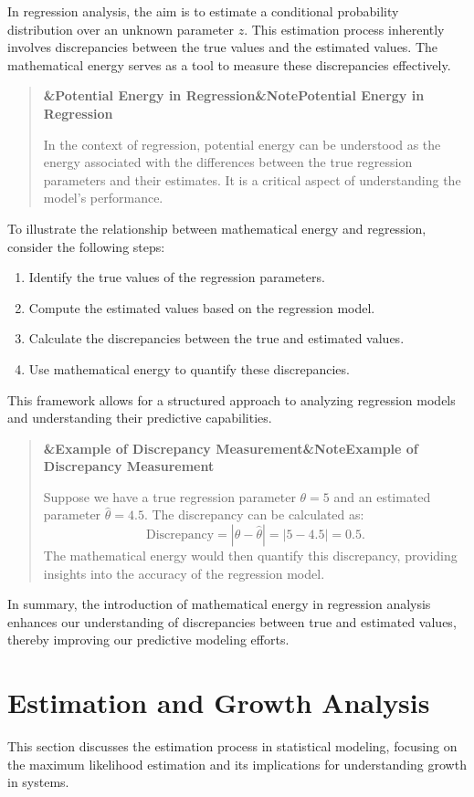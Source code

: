 \documentclass[a4paper]{article}
\newcommand{\boxheading}[1]{%
  \par\smallskip
  \noindent\textbf{\ifx&#1&Note\else#1\fi}\par
  \smallskip
}
\newenvironment{thmbox}[1][]{%
  \begin{quote}\color{blue!60!black}\boxheading{#1}\normalcolor
}{\end{quote}}
\newenvironment{exbox}[1][]{%
  \begin{quote}\color{brown!70!black}\boxheading{#1}\normalcolor
}{\end{quote}}
\begin{document}
In regression analysis, the aim is to estimate a conditional probability distribution over an unknown parameter \( z \). This estimation process inherently involves discrepancies between the true values and the estimated values. The mathematical energy serves as a tool to measure these discrepancies effectively.

\begin{thmbox}[Potential Energy in Regression]
In the context of regression, potential energy can be understood as the energy associated with the differences between the true regression parameters and their estimates. It is a critical aspect of understanding the model's performance.
\end{thmbox}

To illustrate the relationship between mathematical energy and regression, consider the following steps:

\begin{enumerate}
    \item Identify the true values of the regression parameters.
    \item Compute the estimated values based on the regression model.
    \item Calculate the discrepancies between the true and estimated values.
    \item Use mathematical energy to quantify these discrepancies.
\end{enumerate}

This framework allows for a structured approach to analyzing regression models and understanding their predictive capabilities.

\begin{exbox}[Example of Discrepancy Measurement]
Suppose we have a true regression parameter \( \theta = 5 \) and an estimated parameter \( \hat{\theta} = 4.5 \). The discrepancy can be calculated as:
\[
\text{Discrepancy} = |\theta - \hat{\theta}| = |5 - 4.5| = 0.5.
\]
The mathematical energy would then quantify this discrepancy, providing insights into the accuracy of the regression model.
\end{exbox}

In summary, the introduction of mathematical energy in regression analysis enhances our understanding of discrepancies between true and estimated values, thereby improving our predictive modeling efforts.

\section{Estimation and Growth Analysis}
This section discusses the estimation process in statistical modeling, focusing on the maximum likelihood estimation and its implications for understanding growth in systems.
\end{document}

